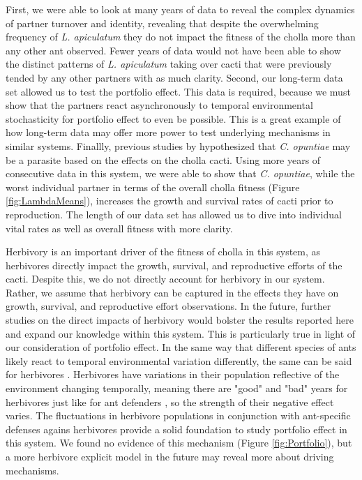 \documentclass[11pt]{article}
\begin{document}
First, we were able to look at many years of data to reveal the complex dynamics of partner turnover and identity, revealing that despite the overwhelming  frequency of \textit{L. apiculatum} they do not impact the fitness of the cholla more than any other ant observed.
Fewer years of data would not have been able to show the distinct patterns of \textit{L. apiculatum} taking over cacti that were previously tended by any other partners with as much clarity.
Second, our long-term data set allowed us to test the portfolio effect.
This data is required, because we must show that the partners react asynchronously to temporal environmental stochasticity for portfolio effect to even be possible.
This is a great example of how long-term data may offer more power to test underlying mechanisms in similar systems.
Finallly, previous studies by \cite{Miller2007} hypothesized that \textit{C. opuntiae} may be a parasite based on the effects on the cholla cacti.
Using more years of consecutive data in this system, we were able to show that \textit{C. opuntiae}, while the worst individual partner in terms of the overall cholla fitness (Figure \ref{fig:LambdaMeans}), increases the growth and survival rates of cacti prior to reproduction.
The length of our data set has allowed us to dive into individual vital rates as well as overall fitness with more clarity.


Herbivory is an important driver of the fitness of cholla in this system, as herbivores directly impact the growth, survival, and reproductive efforts of the cacti.
Despite this, we do not directly account for herbivory in our system. 
Rather, we assume that herbivory can be captured in the effects they have on growth, survival, and reproductive effort observations.
In the future, further studies on the direct impacts of herbivory would bolster the results reported here and expand our knowledge within this system.
This is particularly true in light of our consideration of portfolio effect. 
In the same way that different species of ants likely react to temporal environmental variation differently, the same can be said for herbivores \citep{Thibaut2012}.
Herbivores have variations in their population reflective of the environment changing temporally, meaning there are "good" and "bad" years for herbivores just like for ant defenders \citep{Batstone2018}, so the strength of their negative effect varies. 
The fluctuations in herbivore populations in conjunction with ant-specific defenses agains herbivores provide a solid foundation to study portfolio effect in this system. 
We found no evidence of this mechanism (Figure \ref{fig:Portfolio}), but a more herbivore explicit model in the future may reveal more about driving mechanisms. 
\end{document}
